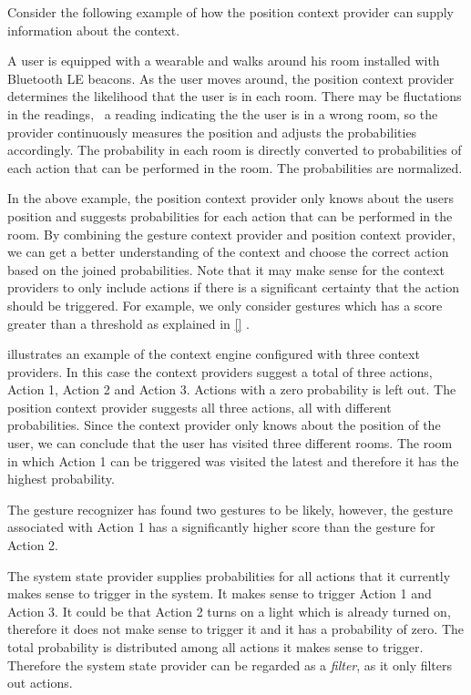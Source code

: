 Consider the following example of how the position context provider can supply information about the context.

\begin{testexample}
A user is equipped with a wearable and walks around his room installed with Bluetooth LE beacons. As the user moves around, the position context provider determines the likelihood that the user is in each room. There may be fluctations in the readings, \ie~a reading indicating the the user is in a wrong room, so the provider continuously measures the position and adjusts the probabilities accordingly.
The probability in each room is directly converted to probabilities of each action that can be performed in the room. The probabilities are normalized.
\end{testexample}

In the above example, the position context provider only knows about the users position and suggests probabilities for each action that can be performed in the room. By combining the gesture context provider and position context provider, we can get a better understanding of the context and choose the correct action based on the joined probabilities. Note that it may make sense for the context providers to only include actions if there is a significant certainty that the action should be triggered. For example, we only consider gestures which has a score greater than a threshold as explained in \cref{} .

 illustrates an example of the context engine configured with three context providers. In this case the context providers suggest a total of three actions, Action 1, Action 2 and Action 3. Actions with a zero probability is left out. The position context provider suggests all three actions, all with different probabilities. Since the context provider only knows about the position of the user, we can conclude that the user has visited three different rooms. The room in which Action 1 can be triggered was visited the latest and therefore it has the highest probability.

The gesture recognizer has found two gestures to be likely, however, the gesture associated with Action 1 has a significantly higher score than the gesture for Action 2.

The system state provider supplies probabilities for all actions that it currently makes sense to trigger in the system. It makes sense to trigger Action 1 and Action 3. It could be that Action 2 turns on a light which is already turned on, therefore it does not make sense to trigger it and it has a probability of zero. The total probability is distributed among all actions it makes sense to trigger. Therefore the system state provider can be regarded as a \textit{filter}, as it only filters out actions.

